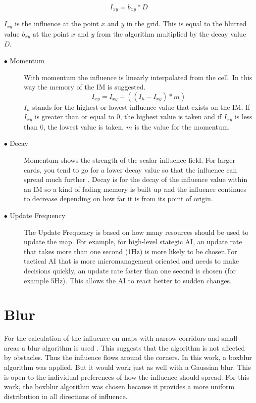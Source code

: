 \documentclass[]{report}
\begin{document}
	\begin{equation}
		I_{xy} = b_{xy} * D
	\end{equation}
	
	$I_{xy}$ is the influence at the point $x$ and $y$ in the grid. This is equal to the blurred value $b_{xy}$ at the point $x$ and $y$ from the algorithm multiplied by the decay value $D$.
	
	
	\begin{description}
		\item[$\bullet$ Momentum] With momentum the influence is linearly interpolated from the cell. In this way the memory of the IM is suggested.
		\begin{equation}
			I_{xy} = I_{xy} + ((I_{h} - I_{xy}) * m) 
		\end{equation}
		$I_{h}$ stands for the highest or lowest influence value that exists on the IM. If $I_{xy}$ is greater than or equal to $0$, the highest value is taken and if $I_{xy}$ is less than $0$, the lowest value is taken. $m$ is the value for the momentum. 
		
		\item[$\bullet$ Decay] Momentum shows the strength of the scalar influence field. For larger cards, you tend to go for a lower decay value so that the influence can spread much further \citep{imPathfinding}.  Decay is for the decay of the influence value within an \ac{IM} so a kind of fading memory is built up and the influence continues to decrease depending on how far it is from its point of origin.
		\item[$\bullet$ Update Frequency] The Update Frequency is based on how many resources should be used to update the map. For example, for high-level stategic \ac{AI}, an update rate that takes more than one second (1Hz) is more likely to be chosen.For tactical \ac{AI} that is more micromanagement oriented and needs to make decisions quickly, an update rate faster than one second is chosen (for example 5Hz). This allows the AI to react better to sudden changes. \citep{gameDevInfluenceMap} \citep{imPathfinding}
		\end {description}
		
		\section{Blur } \label{ssec:num1}
		For the calculation of the influence on maps with narrow corridors and small areas a blur algorithm is used \citep{gameDevInfluenceMap}. \newline This suggests that the algorithm is not affected by obstacles. Thus the influence flows around the corners. In this work, a boxblur algorithm was applied. But it would work just as well with a Gaussian blur. This is open to the individual preferences of how the influence should spread. For this work, the boxblur algorithm was chosen because it provides a more uniform distribution in all directions of influence. 
		
\end{document}
